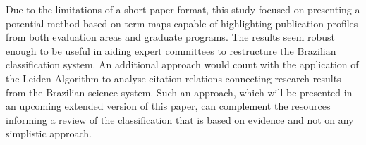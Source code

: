 Due to the limitations of a short paper format, this study focused on presenting a potential method based on term maps capable of highlighting publication profiles from both evaluation areas and graduate programs. The results seem robust enough to be useful in aiding expert committees to restructure the Brazilian classification system. An additional approach would count with the application of the Leiden Algorithm \autocite{Traag.2019} to analyse citation relations connecting research results from the Brazilian science system. Such an approach, which will be presented in an upcoming extended version of this paper, can complement the resources informing a review of the classification that is based on evidence and not on any simplistic approach.